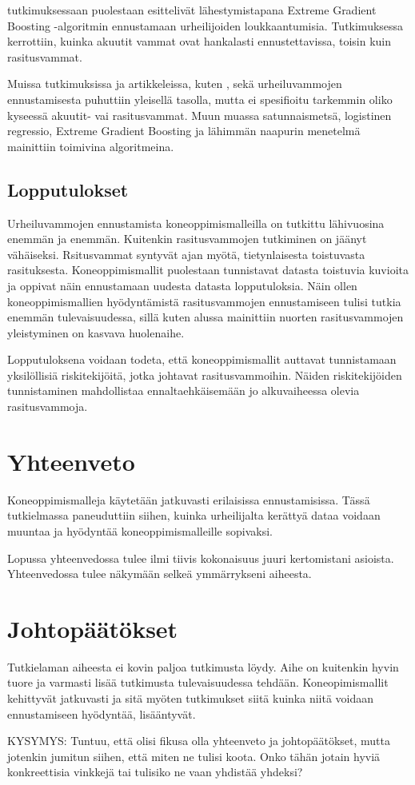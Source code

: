 \documentclass[utf8, bachelor]{gradu3}
\begin{document}
\textcite{InjuryPredictioninCompetitiveRunnersWithMachineLearning} tutkimuksessaan puolestaan esittelivät lähestymistapana Extreme Gradient Boosting -algoritmin ennustamaan urheilijoiden 
loukkaantumisia. Tutkimuksessa kerrottiin, kuinka akuutit vammat ovat hankalasti ennustettavissa, toisin kuin rasitusvammat. 

Muissa tutkimuksissa ja artikkeleissa, kuten \textcite{murugan_comparison_2025}, \textcite{bhatia_exploring_2024} sekä \textcite{yuan_machine_2026} urheiluvammojen ennustamisesta 
puhuttiin yleisellä tasolla, mutta ei spesifioitu tarkemmin oliko kyseessä akuutit- vai rasitusvammat. Muun muassa satunnaismetsä, logistinen regressio, Extreme Gradient Boosting 
ja lähimmän naapurin menetelmä mainittiin toimivina algoritmeina.

\section{Lopputulokset}

Urheiluvammojen ennustamista koneoppimismalleilla on tutkittu lähivuosina enemmän ja enemmän. Kuitenkin rasitusvammojen tutkiminen on jäänyt vähäiseksi. Rsitusvammat 
syntyvät ajan myötä, tietynlaisesta toistuvasta rasituksesta. Koneoppimismallit puolestaan tunnistavat datasta toistuvia kuvioita ja oppivat näin ennustamaan uudesta datasta 
lopputuloksia. Näin ollen koneoppimismallien hyödyntämistä rasitusvammojen ennustamiseen tulisi tutkia enemmän tulevaisuudessa, sillä kuten alussa mainittiin nuorten rasitusvammojen 
yleistyminen on kasvava huolenaihe.

Lopputuloksena voidaan todeta, että koneoppimismallit auttavat tunnistamaan yksilöllisiä riskitekijöitä, jotka johtavat rasitusvammoihin. Näiden riskitekijöiden tunnistaminen 
mahdollistaa ennaltaehkäisemään jo alkuvaiheessa olevia rasitusvammoja.

\chapter{Yhteenveto}

Koneoppimismalleja käytetään jatkuvasti erilaisissa ennustamisissa. Tässä tutkielmassa paneuduttiin siihen, kuinka urheilijalta kerättyä 
dataa voidaan muuntaa ja hyödyntää koneoppimismalleille sopivaksi.

Lopussa yhteenvedossa tulee ilmi tiivis kokonaisuus juuri kertomistani asioista. Yhteenvedossa tulee näkymään selkeä ymmärrykseni aiheesta.

\chapter{Johtopäätökset}

Tutkielaman aiheesta ei kovin paljoa tutkimusta löydy. Aihe on kuitenkin hyvin tuore ja varmasti lisää tutkimusta tulevaisuudessa tehdään. 
Koneopimismallit kehittyvät jatkuvasti ja sitä myöten tutkimukset siitä kuinka niitä voidaan ennustamiseen hyödyntää, lisääntyvät.

KYSYMYS: Tuntuu, että olisi fikusa olla yhteenveto ja johtopäätökset, mutta jotenkin jumitun siihen, että miten ne tulisi koota. Onko tähän jotain hyviä konkreettisia vinkkejä tai tulisiko ne vaan yhdistää yhdeksi?

\printbibliography
\end{document}
